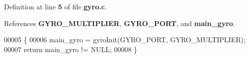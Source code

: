Definition at line \textbf{ 5} of file \textbf{ gyro.\+c}.



References \textbf{ G\+Y\+R\+O\+\_\+\+M\+U\+L\+T\+I\+P\+L\+I\+ER}, \textbf{ G\+Y\+R\+O\+\_\+\+P\+O\+RT}, and \textbf{ main\+\_\+gyro}.


\begin{DoxyCode}
00005                       \{
00006   main_gyro = gyroInit(GYRO_PORT, GYRO_MULTIPLIER);
00007   \textcolor{keywordflow}{return} main_gyro != NULL;
00008 \}
\end{DoxyCode}
